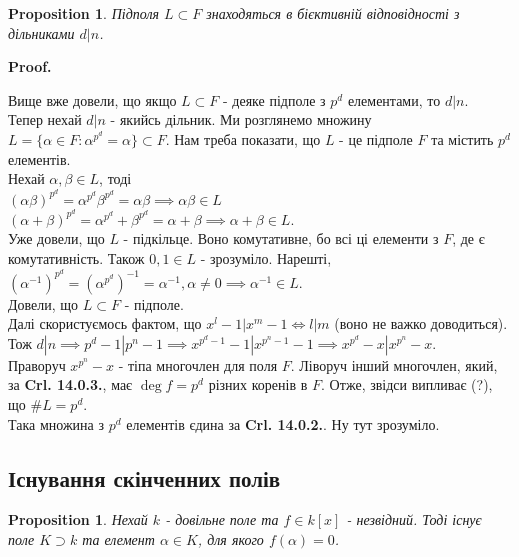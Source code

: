\documentclass[a4paper, 14pt]{extarticle}
\makeatletter
\theoremstyle{theoremdd}
\theoremstyle{theoremdd}
\theoremstyle{theoremdd}
\theoremstyle{theoremdd}
\theoremstyle{theoremdd}
\newtheorem{proposition}[theorem]{Proposition}
\theoremstyle{theoremdd}
\theoremstyle{theoremdd}
\theoremstyle{theoremdd}
\def\qed{$\blacksquare$}
\renewenvironment{proof}[1][Proof.\\]{\par
\pushQED{\hfill \qed}%
\normalfont \topsep6\p@\@plus6\p@\relax
\trivlist
\item\relax
{\bfseries
#1\@addpunct{.}}\hspace\labelsep\ignorespaces
}{%
\popQED\endtrivlist\@endpefalse
}
\makeatother
\begin{document}
\begin{proposition}
Підполя $L \subset F$ знаходяться в бієктивній відповідності з дільниками $d | n$.
\end{proposition}

\begin{proof}
Вище вже довели, що якщо $L \subset F$ - деяке підполе з $p^d$ елементами, то $d | n$.\\
Тепер нехай $d | n$ - якийсь дільник. Ми розглянемо множину $L = \{ \alpha \in F: \alpha^{p^d} = \alpha \} \subset F$. Нам треба показати, що $L$ - це підполе $F$ та містить $p^d$ елементів.\\
Нехай $\alpha,\beta \in L$, тоді \\
$(\alpha \beta)^{p^d} = \alpha^{p^d} \beta^{p^d} = \alpha \beta \implies \alpha \beta \in L$\\
$(\alpha + \beta)^{p^d} = \alpha^{p^d} + \beta^{p^d} = \alpha + \beta \implies \alpha + \beta \in L$.\\
Уже довели, що $L$ - підкільце. Воно комутативне, бо всі ці елементи з $F$, де є комутативність. Також $0,1 \in L$ - зрозуміло. Нарешті,\\
$(\alpha^{-1})^{p^d} = (\alpha^{p^d})^{-1} = \alpha^{-1}, \alpha \neq 0 \implies \alpha^{-1} \in L$.\\
Довели, що $L \subset F$ - підполе.\\
Далі скористуємось фактом, що $x^l - 1 | x^m - 1 \iff l | m$ (воно не важко доводиться).\\
Тож $d | n \implies p^d-1 | p^n - 1 \implies x^{p^d-1}-1 | x^{p^n-1}-1 \implies x^{p^d} - x | x^{p^n} - x$.\\
Праворуч $x^{p^n}-x$ - тіпа многочлен для поля $F$. Ліворуч інший многочлен, який, за \textbf{Crl. 14.0.3.}, має $\deg f = p^d$ різних коренів в $F$. Отже, звідси випливає (?), що $\# L = p^d$.\\
Така множина з $p^d$ елементів єдина за \textbf{Crl. 14.0.2.}. Ну тут зрозуміло.
\end{proof}

\subsection{Існування скінченних полів}
\begin{proposition}
Нехай $k$ - довільне поле та $f \in k[x]$ - незвідний. Тоді існує поле $K \supset k$ та елемент $\alpha \in K$, для якого $f(\alpha) = 0$.
\end{proposition}
\end{document}
